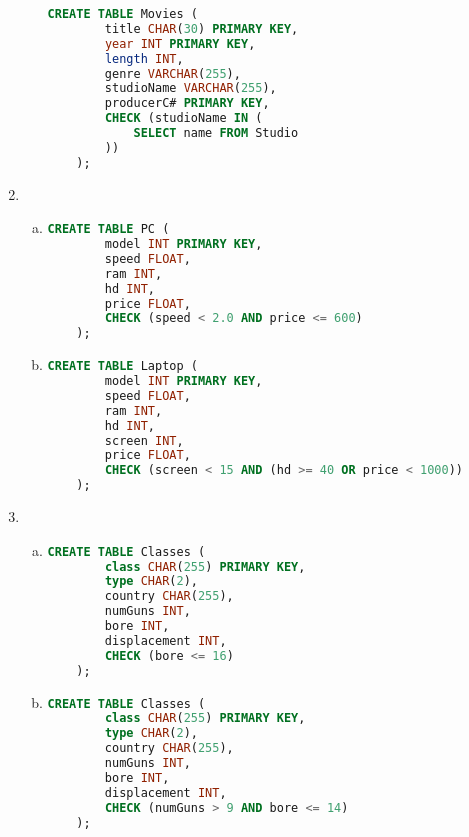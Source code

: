 \documentclass[12pt]{article}
\begin{document}
\begin{enumerate}[1.]
\begin{enumerate}[a)]
\begin{lstlisting}[language=SQL]
    CREATE TABLE Movies (
        title CHAR(30) PRIMARY KEY,
        year INT PRIMARY KEY,
        length INT,
        genre VARCHAR(255),
        studioName VARCHAR(255),
        producerC# PRIMARY KEY,
        CHECK (studioName IN (
            SELECT name FROM Studio
        ))
    );
    \end{lstlisting}
    \end{enumerate}

    \item

    \begin{enumerate}[a)]
        \item
    \begin{lstlisting}[language=SQL]
    CREATE TABLE PC (
        model INT PRIMARY KEY,
        speed FLOAT,
        ram INT,
        hd INT,
        price FLOAT,
        CHECK (speed < 2.0 AND price <= 600)
    );
    \end{lstlisting}

        \item
    \begin{lstlisting}[language=SQL]
    CREATE TABLE Laptop (
        model INT PRIMARY KEY,
        speed FLOAT,
        ram INT,
        hd INT,
        screen INT,
        price FLOAT,
        CHECK (screen < 15 AND (hd >= 40 OR price < 1000))
    );
    \end{lstlisting}
    \end{enumerate}

    \item

    \begin{enumerate}[a)]
        \item

    \begin{lstlisting}[language=SQL]
    CREATE TABLE Classes (
        class CHAR(255) PRIMARY KEY,
        type CHAR(2),
        country CHAR(255),
        numGuns INT,
        bore INT,
        displacement INT,
        CHECK (bore <= 16)
    );
    \end{lstlisting}

        \item

    \begin{lstlisting}[language=SQL]
    CREATE TABLE Classes (
        class CHAR(255) PRIMARY KEY,
        type CHAR(2),
        country CHAR(255),
        numGuns INT,
        bore INT,
        displacement INT,
        CHECK (numGuns > 9 AND bore <= 14)
    );
    \end{lstlisting}


\end{enumerate}
\end{enumerate}
\end{document}
